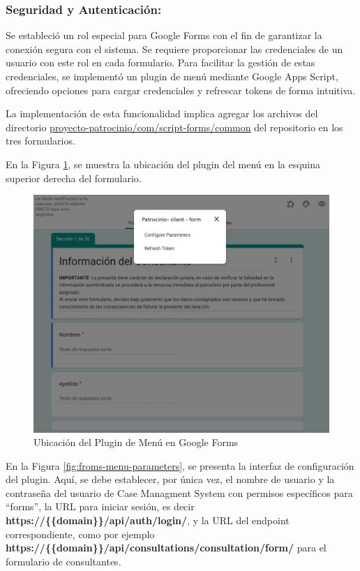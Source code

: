 \subsubsection{Seguridad y Autenticación:}\label{subsubsec:app-script-menu}
Se estableció un rol especial para Google Forms con el fin de garantizar la conexión segura con el sistema. Se requiere proporcionar las credenciales de un usuario con este rol en cada formulario. Para facilitar la gestión de estas credenciales, se implementó un plugin de menú mediante Google Apps Script, ofreciendo opciones para cargar credenciales y refrescar tokens de forma intuitiva.

La implementación de esta funcionalidad implica agregar los archivos del directorio \href{https://github.com/proyecto-patrocinio/proyecto-patrocinio/tree/main/com/script-forms/common}{proyecto-patrocinio/com/script-forms/common} del repositorio en los tres formularios.

En la Figura \ref{fig:forms-menu-1}, se muestra la ubicación del plugin del menú en la esquina superior derecha del formulario.

\begin{figure}[H]
    \centering
    \includegraphics[width=1\linewidth]{fig/forms-menu-2.png}
    \caption{Ubicación del Plugin de Menú en Google Forms}
    \label{fig:forms-menu-1}
\end{figure}

En la Figura \ref{fig:froms-menu-parameters}, se presenta la interfaz de configuración del plugin. Aquí, se debe establecer, por única vez, el nombre de usuario y la contraseña del usuario de Case Managment System con permisos específicos para ``forms'', la URL para iniciar sesión, es decir \textbf{https://\{\{domain\}\}/api/auth/login/}, y la URL del endpoint correspondiente, como por ejemplo \textbf{https://\{\{domain\}\}/api/consultations/consultation/form/} para el formulario de consultantes.

